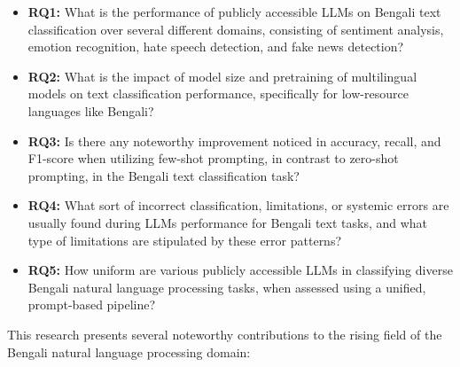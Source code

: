 \documentclass[10pt,letterpaper]{article}
\begin{document}
\begin{itemize}
\setlength{\itemsep}{0pt}
\setlength{\parskip}{0pt}
    \item \textbf{RQ1:} What is the performance of publicly accessible LLMs on Bengali text classification over several different domains, consisting of sentiment analysis, emotion recognition, hate speech detection, and fake news detection?
    \item \textbf{RQ2:} What is the impact of model size and pretraining of multilingual models on text classification performance, specifically for low-resource languages like Bengali?
    \item \textbf{RQ3:} Is there any noteworthy improvement noticed in accuracy, recall, and F1-score when utilizing few-shot prompting, in contrast to zero-shot prompting, in the Bengali text classification task?
    \item \textbf{RQ4:} What sort of incorrect classification, limitations, or systemic errors are usually found during LLMs performance for Bengali text tasks, and what type of limitations are stipulated by these error patterns?
    \item \textbf{RQ5:} How uniform are various publicly accessible LLMs in classifying diverse Bengali natural language processing tasks, when assessed using a unified, prompt-based pipeline?
\end{itemize}

This research presents several noteworthy contributions to the rising field of the Bengali natural language processing domain:
\end{document}
